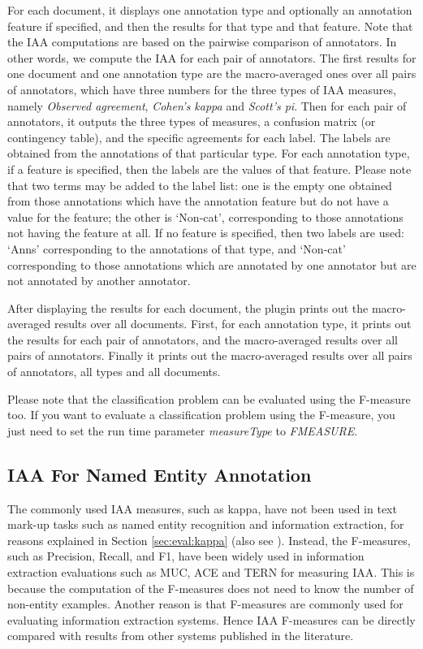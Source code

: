 For each document, it displays one annotation type and optionally an annotation
feature if specified, and then the results for that type and that feature. Note
that the IAA computations are based on the pairwise comparison of annotators. In
other words, we compute the IAA for each pair of annotators. The first results
for one document and one annotation type are the macro-averaged ones over all
pairs of annotators, which have three numbers for the three types of IAA
measures, namely {\em Observed agreement}, {\em Cohen's kappa} and {\em Scott's
pi}. Then for each pair of annotators, it outputs the three types of measures, a
confusion matrix (or contingency table), and the specific agreements for each
label.  The labels are obtained from the annotations of that particular type. For
each annotation type, if a feature is specified, then the labels are the values
of that feature. Please note that two terms may be added to the label list: one
is the empty one obtained from those annotations which have the annotation
feature but do not have a value for the feature; the other is `Non-cat',
corresponding to those annotations not having the feature at all. If no feature
is specified, then two labels are used: `Anns' corresponding to the annotations
of that type, and `Non-cat' corresponding to those annotations which are
annotated by one annotator but are not annotated by another annotator.

After displaying the results for each document, the plugin prints out the
macro-averaged results over all documents. First, for each annotation type, it
prints out the results for each pair of annotators, and the macro-averaged
results over all pairs of annotators. Finally it prints out the macro-averaged
results over all pairs of annotators, all types and all documents.

Please note that the classification problem can be evaluated using the F-measure
too. If you want to evaluate a classification problem using the F-measure, you
just need to set the run time parameter {\em measureType} to {\em FMEASURE}.

\subsection{IAA For Named Entity Annotation}

The commonly used IAA measures, such as kappa, have not been used in text mark-up
tasks such as named entity recognition and information extraction, for reasons
explained in Section \ref{sec:eval:kappa} (also see \cite{Hripcsak05}). Instead,
the F-measures, such as Precision, Recall, and F1, have been widely used in
information extraction evaluations such as MUC, ACE and TERN for measuring IAA.
This is because the computation of the F-measures does not need to know the
number of non-entity examples. Another reason is that F-measures are commonly
used for evaluating information extraction systems. Hence IAA F-measures can be
directly compared with results from other systems published in the literature.

